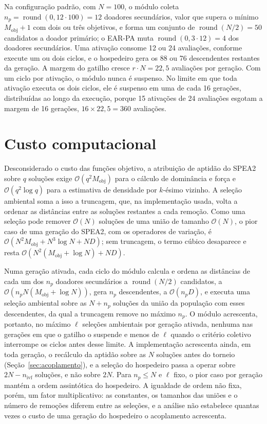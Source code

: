 Na configuração padrão, com $N = 100$, o módulo coleta $n_p = \operatorname{round}(0{,}12 \cdot 100) = 12$ doadores secundários, valor que supera o mínimo $M_{\text{obj}} + 1$ com dois ou três objetivos, e forma um conjunto de $\operatorname{round}(N/2) = 50$ candidatos a doador primário; o EAR-PA muta $\operatorname{round}(0{,}3 \cdot 12) = 4$ dos doadores secundários. Uma ativação consome 12 ou 24 avaliações, conforme execute um ou dois ciclos, e o hospedeiro gera os 88 ou 76 descendentes restantes da geração. A margem do gatilho cresce $r \cdot N = 22{,}5$ avaliações por geração. Com um ciclo por ativação, o módulo nunca é suspenso. No limite em que toda ativação executa os dois ciclos, ele é suspenso em uma de cada 16 gerações, distribuídas ao longo da execução, porque 15 ativações de 24 avaliações esgotam a margem de 16 gerações, $16 \times 22{,}5 = 360$ avaliações.

\section{Custo computacional}
\label{sec:custo}

Desconsiderado o custo das funções objetivo, a atribuição de aptidão do SPEA2 sobre $q$ soluções exige $\mathcal{O}(q^2 M_{\text{obj}})$ para o cálculo de dominância e força e $\mathcal{O}(q^2 \log q)$ para a estimativa de densidade por $k$-ésimo vizinho. A seleção ambiental soma a isso a truncagem, que, na implementação usada, volta a ordenar as distâncias entre as soluções restantes a cada remoção. Como uma seleção pode remover $\mathcal{O}(N)$ soluções de uma união de tamanho $\mathcal{O}(N)$, o pior caso de uma geração do SPEA2, com os operadores de variação, é $\mathcal{O}(N^2 M_{\text{obj}} + N^3 \log N + N D)$; sem truncagem, o termo cúbico desaparece e resta $\mathcal{O}(N^2(M_{\text{obj}} + \log N) + N D)$.

Numa geração ativada, cada ciclo do módulo calcula e ordena as distâncias de cada um dos $n_p$ doadores secundários a $\operatorname{round}(N/2)$ candidatos, a $\mathcal{O}(n_p N (M_{\text{obj}} + \log N))$, gera $n_p$ descendentes, a $\mathcal{O}(n_p D)$, e executa uma seleção ambiental sobre as $N + n_p$ soluções da união da população com esses descendentes, da qual a truncagem remove no máximo $n_p$. O módulo acrescenta, portanto, no máximo $\ell$ seleções ambientais por geração ativada, nenhuma nas gerações em que o gatilho o suspende e menos de $\ell$ quando o critério coletivo interrompe os ciclos antes desse limite. A implementação acrescenta ainda, em toda geração, o recálculo da aptidão sobre as $N$ soluções antes do torneio (Seção~\ref{sec:acoplamento}), e a seleção do hospedeiro passa a operar sobre $2N - n_{\text{ivf}}$ soluções, e não sobre $2N$. Para $n_p \leq N$ e $\ell$ fixo, o pior caso por geração mantém a ordem assintótica do hospedeiro. A igualdade de ordem não fixa, porém, um fator multiplicativo: as constantes, os tamanhos das uniões e o número de remoções diferem entre as seleções, e a análise não estabelece quantas vezes o custo de uma geração do hospedeiro o acoplamento acrescenta.

